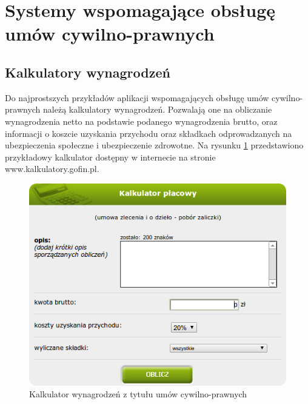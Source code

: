 \section[Systemy wspomagające obsługę umów cywilno-prawnych][Systemy wspomagające obsługę umów cywilno-prawnych]{Systemy wspomagające obsługę umów cywilno-prawnych}

\subsection[Kalkulatory wynagrodzeń][Kalkulatory wynagrodzeń]{Kalkulatory wynagrodzeń}
Do najprostszych przykładów aplikacji wspomagających obsługę umów cywilno-prawnych należą kalkulatory wynagrodzeń. Pozwalają one na obliczanie wynagrodzenia netto na podstawie podanego wynagrodzenia brutto, oraz informacji o koszcie uzyskania przychodu oraz składkach odprowadzanych na ubezpieczenia społeczne i ubezpieczenie zdrowotne. Na rysunku \ref{kalkulator} przedstawiono przykładowy kalkulator dostępny w internecie na stronie www.kalkulatory.gofin.pl.

\begin{figure}[tdh]
    \begin{center}
	\includegraphics[scale=.6]{img/kalkulator.png}
	\caption{Kalkulator wynagrodzeń z tytułu umów cywilno-prawnych}
	\label{kalkulator}
    \end{center}
\end{figure}

